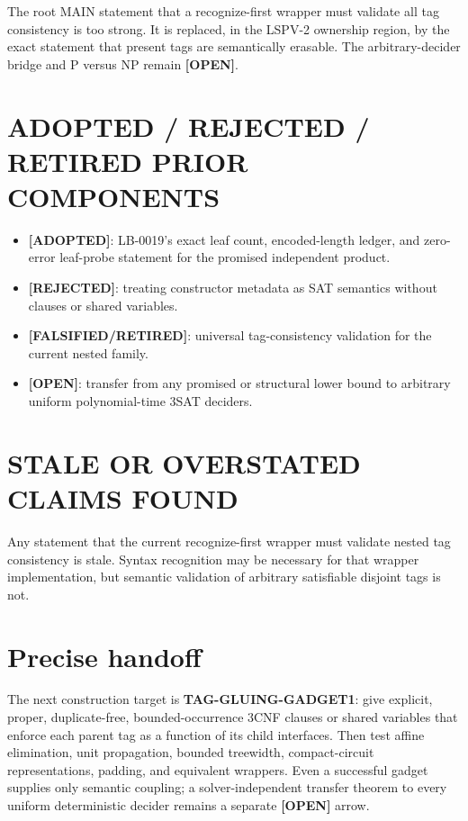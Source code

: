 \documentclass[11pt]{article}
\newcommand{\status}[1]{\textbf{[#1]}}
\begin{document}
The root MAIN statement that a recognize-first wrapper must validate all
tag consistency is too strong.  It is replaced, in the LSPV-2 ownership
region, by the exact statement that present tags are semantically erasable.
The arbitrary-decider bridge and P versus NP remain \status{OPEN}.

\section{ADOPTED / REJECTED / RETIRED PRIOR COMPONENTS}

\begin{itemize}
\item \status{ADOPTED}: LB-0019's exact leaf count, encoded-length ledger,
and zero-error leaf-probe statement for the promised independent product.
\item \status{REJECTED}: treating constructor metadata as SAT semantics
without clauses or shared variables.
\item \status{FALSIFIED/RETIRED}: universal tag-consistency validation for
the current nested family.
\item \status{OPEN}: transfer from any promised or structural lower bound
to arbitrary uniform polynomial-time 3SAT deciders.
\end{itemize}

\section{STALE OR OVERSTATED CLAIMS FOUND}

Any statement that the current recognize-first wrapper must validate
nested tag consistency is stale.  Syntax recognition may be necessary for
that wrapper implementation, but semantic validation of arbitrary
satisfiable disjoint tags is not.

\section{Precise handoff}

The next construction target is \textbf{TAG-GLUING-GADGET1}: give explicit,
proper, duplicate-free, bounded-occurrence 3CNF clauses or shared variables
that enforce each parent tag as a function of its child interfaces.
Then test affine elimination, unit propagation, bounded treewidth,
compact-circuit representations, padding, and equivalent wrappers.  Even a
successful gadget supplies only semantic coupling; a solver-independent
transfer theorem to every uniform deterministic decider remains a separate
\status{OPEN} arrow.
\end{document}
